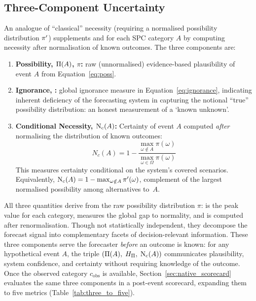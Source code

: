 \subsection{Three-Component Uncertainty}\label{sec:three_component}

An analogue of ``classical'' necessity (requiring a normalised
possibility distribution $\pi'$) supplements \poss{} and \ign{} for
each SPC category $A$ by computing necessity after normalisation of
known outcomes. The three components are:

\begin{enumerate}[leftmargin=2em]
\item \textbf{Possibility, $\Pi(A)$, $\pi$:} raw (unnormalised)
     evidence-based plausibility of event $A$
     from Equation~\eqref{eq:poss}.
\item \textbf{Ignorance, \ign{}:} global ignorance measure in
    Equation~\eqref{eq:ignorance},
    indicating inherent deficiency of the
    forecasting system in capturing the
    notional ``true'' possibility
    distribution: an honest measurement of a `known unknown'.
\item \textbf{Conditional Necessity, $\mathrm{N}_{\mathrm{c}}(A)$:} Certainty of
    event $A$ computed \textit{after} normalising the distribution of
    known outcomes:
\begin{equation}
N_c(A) = 1 - \frac{\max_{\omega \notin A} \pi(\omega)}%
    {\max_{\omega \in \Omega} \pi(\omega)} \label{eq:cond_nec}
\end{equation}
This measures certainty conditional on the system's covered scenarios.
Equivalently, $\mathrm{N}_{\mathrm{c}}(A) = 1 - \max_{\omega \notin A} \pi'(\omega)$,
complement of the largest normalised
possibility among alternatives to~$A$.
\end{enumerate}

All three quantities derive from the raw
possibility distribution $\pi$:
\poss{} is the peak value for each category,
\ign{} measures the global gap to normality,
and \Nc{} is computed after renormalisation.
Though not statistically independent,
they decompose the forecast signal into
complementary facets of decision-relevant
information.
These three components serve the forecaster
\textit{before} an outcome
is known: for any hypothetical event $A$, the triple
$(\Pi(A),\; H_{\Pi},\; \mathrm{N}_{\mathrm{c}}(A))$ communicates plausibility, system
confidence, and certainty without requiring knowledge of the outcome.
Once the observed category $c_{\mathrm{obs}}$ is available,
Section~\ref{sec:native_scorecard} evaluates the same three components
in a post-event scorecard, expanding them to five metrics
(Table~\ref{tab:three_to_five}).

